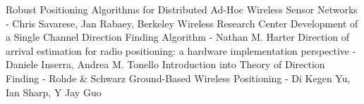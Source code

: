 \begin{thebibliography}{10}
 Robust Positioning Algorithms for Distributed Ad-Hoc Wireless Sensor Networks - 
Chris Savarese, Jan Rabaey, 
Berkeley Wireless Research Center 
 Development of a Single Channel Direction Finding Algorithm - 
Nathan M. Harter
 Direction of arrival estimation for radio positioning:
a hardware implementation perspective - 
Daniele Inserra, Andrea M. Tonello
 Introduction into Theory of Direction Finding - Rohde & Schwarz
 Ground-Based Wireless Positioning - Di Kegen Yu, Ian Sharp, Y Jay Guo
\end{thebibliography}
